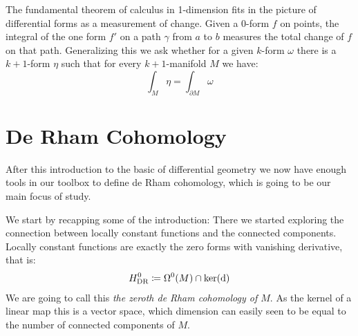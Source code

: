 The fundamental theorem of calculus in 1-dimension fits in the picture of differential
forms as a measurement of change. Given a $0$-form $f$ on points, the integral of the
one form $f'$ on a path $\gamma$ from $a$ to $b$ measures the total change of $f$
on that path. Generalizing this we ask whether for a given $k$-form $\omega$ there
is a $k + 1$-form $\eta$ such that for every $k+1$-manifold $M$ we have:
\[
	\int_M \eta = \int_{\partial M} \omega
\]
\section{De Rham Cohomology}
After this introduction to the basic of differential geometry we now have enough
tools in our toolbox to define de Rham cohomology, which is going to be our main
focus of study.

We start by recapping some of the introduction: There we started exploring the connection between
locally constant functions and the connected components. Locally constant functions are exactly the
zero forms with vanishing derivative, that is:
\begin{align*}
	H^0_{\text{DR}} \coloneqq \Omega^0(M) \cap \ker(\mathrm{d})
\end{align*}
We are going to call this \textit{the zeroth de Rham cohomology of $M$}. As the kernel of a linear map this is a
vector space, which dimension can easily seen to be equal to the number of connected components of $M$.

